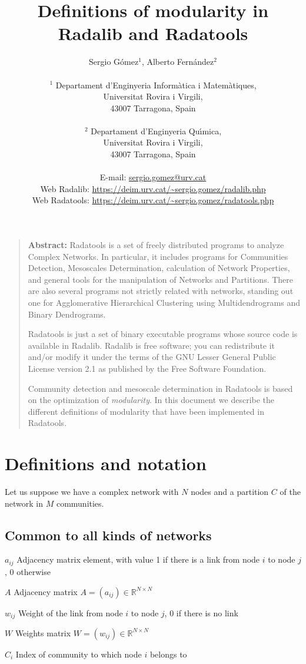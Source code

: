 \documentclass[11pt]{article}
\title{\bf \Large Definitions of modularity in {\sc Radalib} and {\sc Radatools}}
\author{Sergio G{\'o}mez$^1$, Alberto Fern{\'a}ndez$^2$\\
\\
\normalsize{$^1$ Departament d'Enginyeria Inform\`{a}tica i Matem\`{a}tiques,}\\
\normalsize{Universitat Rovira i Virgili,}\\
\normalsize{43007 Tarragona, Spain}\\
\\
\normalsize{$^2$ Departament d'Enginyeria Qu\'{\i}mica,}\\
\normalsize{Universitat Rovira i Virgili,}\\
\normalsize{43007 Tarragona, Spain}\\
\\
\normalsize{E-mail: \url{sergio.gomez@urv.cat}}\\
\normalsize{Web {\sc Radalib}: \url{https://deim.urv.cat/\~sergio.gomez/radalib.php}}\\
\normalsize{Web {\sc Radatools}: \url{https://deim.urv.cat/\~sergio.gomez/radatools.php}}\\
}
\date{}
\newcommand{\bdesc}[2]{\begin{basedescript}{\desclabelstyle{\pushlabel}\desclabelwidth{#1}\setlength{\labelsep}{0mm}\setlength{\leftmargin}{#2}}}
\newcommand{\edesc}{\end{basedescript}}
\begin{document}
\maketitle



\begin{quote}
{\bf Abstract:} {\sc Radatools} is a set of freely distributed programs to analyze Complex Networks. In particular, it includes programs for Communities Detection, Mesoscales Determination, calculation of Network Properties, and general tools for the manipulation of Networks and Partitions. There are also several programs not strictly related with networks, standing out one for Agglomerative Hierarchical Clustering using Multidendrograms and Binary Dendrograms.

{\sc Radatools} is just a set of binary executable programs whose source code is available in {\sc Radalib}. {\sc Radalib} is free software; you can redistribute it and/or modify it under the terms of the GNU Lesser General Public License version 2.1 as published by the Free Software Foundation.

Community detection and mesoscale determination in {\sc Radatools} is based on the optimization of {\em modularity}. In this document we describe the different definitions of modularity that have been implemented in {\sc Radatools}.
\end{quote}

\newpage


\section{Definitions and notation}

Let us suppose we have a complex network with $N$ nodes and a partition $C$ of the
network in $M$ communities.


\subsection{Common to all kinds of networks}

\bdesc{12mm}{12mm}
\item[$a_{ij}$] Adjacency matrix element, with value 1 if there is a link from node $i$ to node $j$, 0 otherwise
\item[$A$] Adjacency matrix $A = (a_{ij}) \in \mathbb{R}^{N\times N}$
\item[$w_{ij}$] Weight of the link from node $i$ to node $j$, 0 if there is no link
\item[$W$] Weights matrix $W = (w_{ij}) \in \mathbb{R}^{N\times N}$
\item[$C_i$] Index of community to which node $i$ belongs to
\edesc
\end{document}
